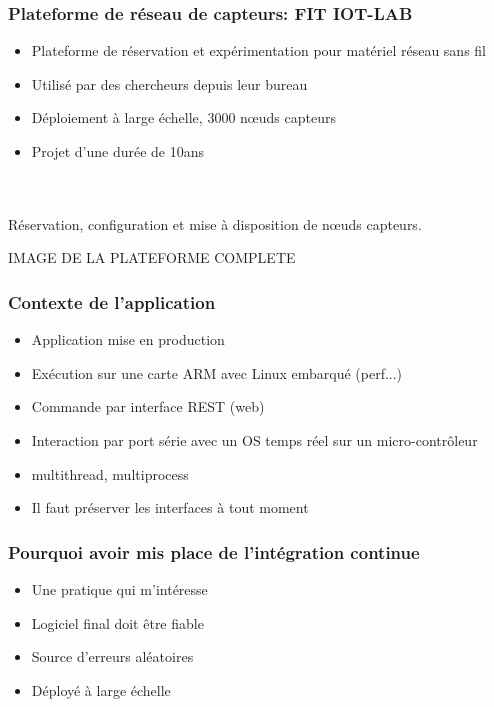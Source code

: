 \documentclass[9pt]{beamer}
\begin{document}
\subsubsection{Plateforme de réseau de capteurs: FIT IOT-LAB}
\begin{frame}{\subsubsecname} %
  \begin{itemize}
    \item <2->{Plateforme de réservation et expérimentation pour matériel réseau sans fil}
    \item <2->{Utilisé par des chercheurs depuis leur bureau}
    \item <2->{Déploiement à large échelle, 3000 nœuds capteurs}
    \item <2->{Projet d'une durée de 10ans}
  \end{itemize}
   ~\\~\\ Réservation, configuration et mise à disposition de nœuds capteurs.
\end{frame}


\begin{frame}{\subsubsecname} %

  IMAGE DE LA PLATEFORME COMPLETE

\end{frame}

\subsubsection{Contexte de l'application}
\begin{frame}{\subsubsecname} %
  \begin{itemize}
    \item Application mise en production
    \item Exécution sur une carte ARM avec Linux embarqué (perf...)
    \item Commande par interface REST (web)
    \item Interaction par port série avec un OS temps réel sur un micro-contrôleur
    \item multithread, multiprocess
    \item Il faut préserver les interfaces à tout moment
  \end{itemize}
\end{frame}


\subsubsection{Pourquoi avoir mis place de l'intégration continue}
\begin{frame}{\subsubsecname} %
  \begin{itemize}
    \item Une pratique qui m'intéresse
    \item Logiciel final doit être fiable
    \item Source d'erreurs aléatoires
    \item Déployé à large échelle
  \end{itemize}
\end{frame}
\end{document}
